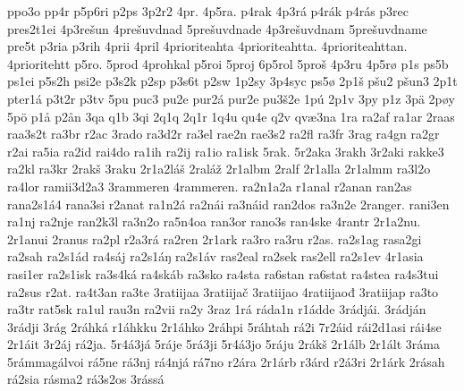 {    ppo3o
    pp4r
    p5p6ri
    p2ps
    3p2r2
    4pr.
    4p5ra.
    p4rak
    4p3rá
    p4rák
    p4rás
    p3rec
    pres2t1ei
    4p3rešun
    4prešuvdnad
    5prešuvdnade
    4p3rešuvdnam
    5prešuvdname
    pre5t
    p3ria
    p3rih
    4prii
    4pril
    4prioriteahta
    4prioriteahtta.
    4prioriteahttan.
    4prioritehtt
    p5ro.
    5prod
    4prohkal
    p5roi
    5proj
    6p5rol
    5proš
    4p3ru
    4p5rø
    p1s
    ps5b
    ps1ei
    p5s2h
    psi2e
    p3s2k
    p2sp
    p3s6t
    p2sw
    1p2sy
    3p4syc
    ps5ø
    2p1š
    pšu2
    pšun3
    2p1t
    pter1á
    p3t2r
    p3tv
    5pu
    puc3
    pu2e
    pur2á
    pur2e
    pu3š2e
    1pú
    2p1v
    3py
    p1z
    3pä
    2pøy
    5pö
    p1å
    p2ån
    3qa
    q1b
    3qi
    2q1q
    2q1r
    1q4u
    qu4e
    q2v
    qvæ3na
    1ra
    ra2af
    ra1ar
    2raas
    raa3s2t
    ra3br
    r2ac
    3rado
    ra3d2r
    ra3el
    rae2n
    rae3s2
    ra2fl
    ra3fr
    3rag
    ra4gn
    ra2gr
    r2ai
    ra5ia
    ra2id
    rai4do
    ra1ih
    ra2ij
    ra1io
    ra1isk
    5rak.
    5r2aka
    3rakh
    3r2aki
    rakke3
    ra2kl
    ra3kr
    2rakš
    3raku
    2r1a2láš
    2raláž
    2r1albm
    2ralf
    2r1alla
    2r1almm
    ra3l2o
    ra4lor
    ramii3d2a3
    3rammeren
    4rammeren.
    ra2n1a2a
    r1anal
    r2anan
    ran2as
    rana2s1á4
    rana3si
    r2anat
    ra1n2á
    ra2nái
    ra3náid
    ran2dos
    ra3n2e
    2ranger.
    rani3en
    ra1nj
    ra2nje
    ran2k3l
    ra3n2o
    ra5n4oa
    ran3or
    rano3s
    ran4ske
    4rantr
    2r1a2nu.
    2r1anui
    2ranus
    ra2pl
    r2a3rá
    ra2ren
    2r1ark
    ra3ro
    ra3ru
    r2as.
    ra2s1ag
    rasa2gi
    ra2sah
    ra2s1ád
    ra4sáj
    ra2s1áŋ
    ra2s1áv
    ras2eal
    ra2sek
    ras2ell
    ra2s1ev
    4r1asia
    rasi1er
    ra2s1isk
    ra3s4ká
    ra4skáb
    ra3sko
    ra4sta
    ra6stan
    ra6stat
    ra4stea
    ra4s3tui
    ra2sus
    r2at.
    ra4t3an
    ra3te
    3ratiijaa
    3ratiijač
    3ratiijao
    4ratiijaođ
    3ratiijap
    ra3to
    ra3tr
    rat5sk
    ra1ul
    rau3n
    ra2vii
    ra2y
    3raz
    1rá
    ráda1n
    r1ádde
    3rádjái.
    3rádján
    3rádji
    3rág
    2ráhká
    r1áhkku
    2r1áhko
    2ráhpi
    5ráhtah
    rá2i
    7r2áid
    rái2d1asi
    rái4se
    2r1áit
    3r2áj
    rá2ja.
    5r4á3já
    5ráje
    5rá3ji
    5r4á3jo
    5ráju
    2rákš
    2r1álb
    2r1ált
    3ráma
    5rámmagálvoi
    rá5ne
    rá3nj
    rá4njá
    rá7no
    r2ára
    2r1árb
    r3árd
    r2á3ri
    2r1árk
    2rásah
    rá2sia
    rásma2
    rá3s2os
    3rássá
}
